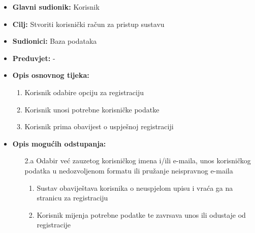                         \noindent {}
					\begin{itemize}
	
						\item \textbf{Glavni sudionik: }Korisnik
						\item  \textbf{Cilj:} Stvoriti korisnički račun za pristup sustavu
						\item  \textbf{Sudionici:} Baza podataka
						\item  \textbf{Preduvjet:} -
						\item  \textbf{Opis osnovnog tijeka:}
						
						\item[] \begin{enumerate}
							\item Korisnik odabire opciju za registraciju
                                \item Korisnik unosi potrebne korisničke podatke
                                \item Korisnik prima obavijest o uspješnoj registraciji
						\end{enumerate}

                            \item  \textbf{Opis mogućih odstupanja:}
						
						\item[] \begin{enumerate}
	
							\item[2.a] Odabir već zauzetog korisničkog imena i/ili e-maila, unos korisničkog podatka u nedozvoljenom formatu ili pružanje neispravnog e-maila
							\item[] \begin{enumerate}
								
								\item Sustav obaviještava korisnika o neuspjelom upisu i vraća ga na stranicu za registraciju
								\item Korisnik mijenja potrebne podatke te zavrsava unos ili odustaje od registracije\\
								
							\end{enumerate}
			
							
						\end{enumerate}
						
					\end{itemize}

